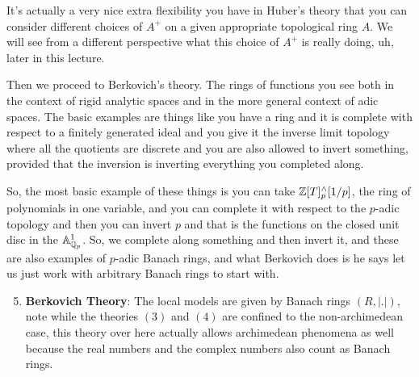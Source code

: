 It's actually a very nice extra flexibility you have in Huber's theory that you can consider different choices of $A^+$ on a given appropriate topological ring $A$. We will see from a different perspective what this choice of $A^+$ is really doing, uh, later in this lecture.



 Then we proceed to Berkovich's theory. The rings of functions you see both in the context of rigid analytic spaces and in the more general context of adic spaces. The basic examples are things like you have a ring and it is complete with respect to a finitely generated ideal and you give it the inverse limit topology where all the quotients are discrete and you are also allowed to invert something, provided that the inversion is inverting everything you completed along.

 So, the most basic example of these things is you can take $\Bbb{Z}[T]^{\wedge}_{p}[1/p]$, the ring of polynomials in one variable, and you can complete it with respect to the $p$-adic topology and then you can invert $p$ and that is the functions on the closed unit disc in the $\mathbb{A}^1_{\Bbb{Q}_p}$. So, we complete along something and then invert it, and these are also examples of $p$-adic Banach rings, and what Berkovich does is he says let us just work with arbitrary Banach rings to start with.
 
\begin{enumerate}
    \setcounter{enumi}{4} 
    \item \textbf{Berkovich Theory}: The local models are given by Banach rings $(R, |.|)$, note while the theories $(3)$ and $(4)$ are confined to the non-archimedean case, this theory over here actually allows archimedean phenomena as well because the real numbers and the complex numbers also count as Banach rings.
\end{enumerate}

